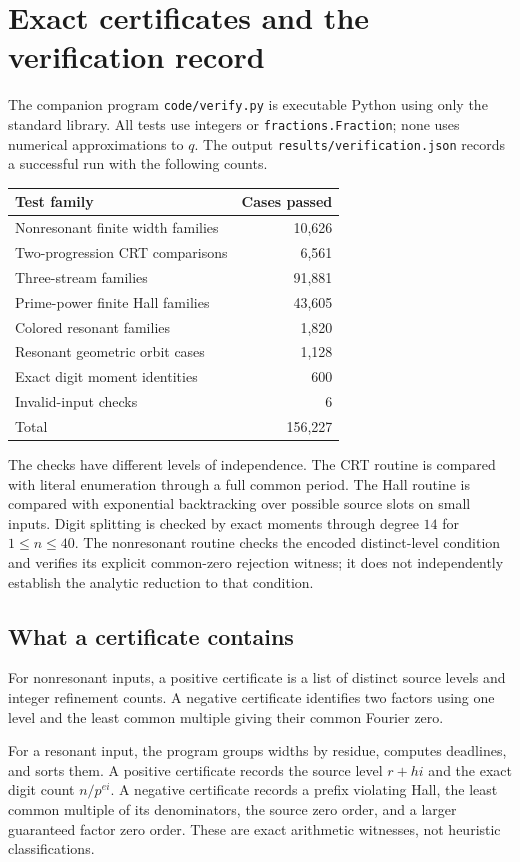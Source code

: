 \documentclass[11pt,letterpaper]{article}
\theoremstyle{definition}
\theoremstyle{remark}
\numberwithin{equation}{section}
\begin{document}
\section{Exact certificates and the verification record}\label{sec:verification}
The companion program \texttt{code/verify.py} is executable Python using only the standard library. All tests use integers or \texttt{fractions.Fraction}; none uses numerical approximations to $q$. The output \texttt{results/verification.json} records a successful run with the following counts.
\begin{center}
\begin{tabular}{lr}
\toprule
Test family & Cases passed\\
\midrule
Nonresonant finite width families & 10,626\\
Two-progression CRT comparisons & 6,561\\
Three-stream families & 91,881\\
Prime-power finite Hall families & 43,605\\
Colored resonant families & 1,820\\
Resonant geometric orbit cases & 1,128\\
Exact digit moment identities & 600\\
Invalid-input checks & 6\\
\midrule
Total & 156,227\\
\bottomrule
\end{tabular}
\end{center}
The checks have different levels of independence. The CRT routine is compared with literal enumeration through a full common period. The Hall routine is compared with exponential backtracking over possible source slots on small inputs. Digit splitting is checked by exact moments through degree $14$ for $1\le n\le40$. The nonresonant routine checks the encoded distinct-level condition and verifies its explicit common-zero rejection witness; it does not independently establish the analytic reduction to that condition.

\subsection{What a certificate contains}
For nonresonant inputs, a positive certificate is a list of distinct source levels and integer refinement counts. A negative certificate identifies two factors using one level and the least common multiple giving their common Fourier zero.

For a resonant input, the program groups widths by residue, computes deadlines, and sorts them. A positive certificate records the source level $r+hi$ and the exact digit count $n/p^{ei}$. A negative certificate records a prefix violating Hall, the least common multiple of its denominators, the source zero order, and a larger guaranteed factor zero order. These are exact arithmetic witnesses, not heuristic classifications.
\end{document}
